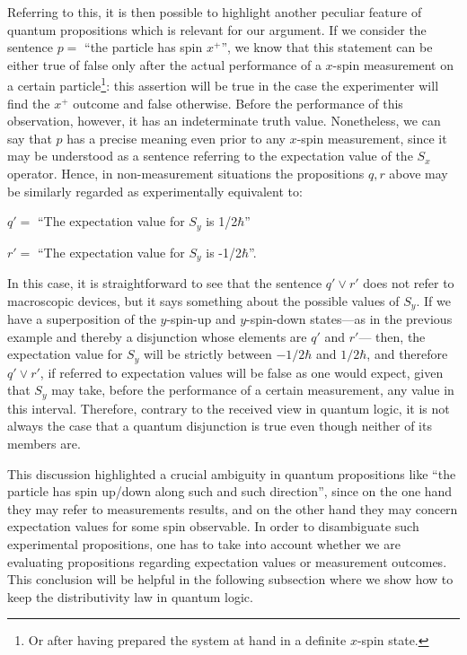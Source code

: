 \documentclass[11pt, executivepaper]{article}
\begin{document}
Referring to this, it is then possible to highlight another peculiar feature of quantum propositions which is relevant for our argument. If we consider the sentence $p=$ ``the particle has spin $x^+$'', we know that this statement can be either true of false only after the actual performance of a $x$-spin measurement on a certain particle\footnote{Or after having prepared the system at hand in a definite $x$-spin state.}: this assertion will be true in the case the experimenter will find the $x^+$ outcome and false otherwise. Before the performance of this observation, however, it has an indeterminate truth value. Nonetheless, we can say that $p$ has a precise meaning even prior to any $x$-spin measurement, since it may be understood as a sentence referring to the expectation value of the $S_x$ operator.  
Hence, in non-measurement situations the propositions $q, r$ above may be similarly regarded as experimentally equivalent to:
\begin{description}
	\item $q' =$ ``The expectation value for $S_y$ is 1/2$\hbar$''
	\item $r' =$ ``The expectation value for $S_y$ is -1/2$\hbar$''.
\end{description}
In this case, it is straightforward to see that the sentence $q' \vee r'$ does not refer to macroscopic devices, but it says something about the possible values of $S_y$. If we have a superposition of the $y$-spin-up and $y$-spin-down states---as in the previous example and thereby a disjunction whose elements are $q'$ and $r'$--- then, the expectation value for $S_y$ will be strictly between $-1/2 \hbar$ and $1/2 \hbar$, and therefore $q' \vee r'$, if referred to expectation values will be false as one would expect, given that $S_y$ may take, before the performance of a certain measurement, any value in this interval. Therefore, contrary to the received view in quantum logic, it is not always the case that a quantum disjunction is true even though neither of its members are. 

This discussion highlighted a crucial ambiguity in quantum propositions like ``the particle has spin up/down along such and such direction'', since on the one hand they may refer to measurements results, and on the other hand they may concern expectation values for some spin observable. In order to disambiguate such experimental propositions, one has to take into account whether we are evaluating propositions regarding expectation values or measurement outcomes. This conclusion will be helpful in the following subsection where we show how to keep the distributivity law in quantum logic.
\end{document}

